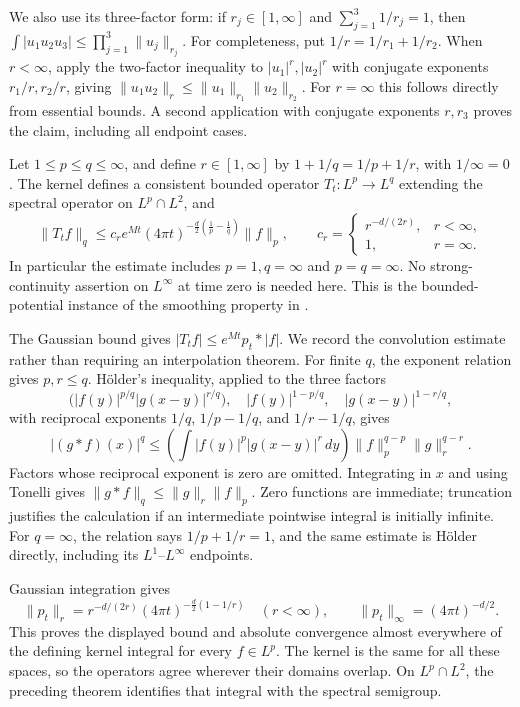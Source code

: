 We also use its three-factor form: if $r_j\in[1,\infty]$ and
$\sum_{j=1}^3 1/r_j=1$, then
$\int|u_1u_2u_3|\leq\prod_{j=1}^3\|u_j\|_{r_j}$.
For completeness, put $1/r=1/r_1+1/r_2$. When $r<\infty$,
apply the two-factor inequality to $|u_1|^r,|u_2|^r$ with conjugate
exponents $r_1/r,r_2/r$, giving
$\|u_1u_2\|_r\leq\|u_1\|_{r_1}\|u_2\|_{r_2}$.
For $r=\infty$ this follows directly from essential bounds.
A second application with conjugate exponents $r,r_3$ proves the
claim, including all endpoint cases.

\begin{corollary}
\label{cor:schrodinger_Lp_Lq}
Let $1\leq p\leq q\leq\infty$, and define $r\in[1,\infty]$ by
$1+1/q=1/p+1/r$, with $1/\infty=0$. The kernel defines a consistent
bounded operator $T_t:L^p\to L^q$ extending the spectral operator on
$L^p\cap L^2$, and
\[
\|T_tf\|_q\leq
c_r e^{Mt}(4\pi t)^{-\frac d2(\frac1p-\frac1q)}\|f\|_p,
\qquad
c_r=\begin{cases}r^{-d/(2r)},&r<\infty,\\1,&r=\infty.\end{cases}
\]
In particular the estimate includes $p=1,q=\infty$ and
$p=q=\infty$. No strong-continuity assertion on $L^\infty$ at time
zero is needed here. This is the bounded-potential instance of the
smoothing property in \parencite[Theorem~2.1]{CyconFroeseKirschSimon1987}.
\end{corollary}
\Proof
The Gaussian bound gives $|T_tf|\leq e^{Mt}p_t*|f|$. We record the
convolution estimate rather than requiring an interpolation theorem.
For finite $q$, the exponent relation gives $p,r\leq q$. H\"older's
inequality, applied to the three factors
\[
\bigl(|f(y)|^{p/q}|g(x-y)|^{r/q}\bigr),\quad
|f(y)|^{1-p/q},\quad |g(x-y)|^{1-r/q},
\]
with reciprocal exponents $1/q$, $1/p-1/q$, and $1/r-1/q$, gives
\[
|(g*f)(x)|^q
\leq\left(\int |f(y)|^p|g(x-y)|^r\,dy\right)
       \|f\|_p^{q-p}\|g\|_r^{q-r}.
\]
Factors whose reciprocal exponent is zero are omitted. Integrating in
$x$ and using Tonelli gives $\|g*f\|_q\leq\|g\|_r\|f\|_p$.
Zero functions are immediate; truncation justifies the calculation if
an intermediate pointwise integral is initially infinite. For
$q=\infty$, the relation says $1/p+1/r=1$, and the same estimate
is H\"older directly, including its $L^1$--$L^\infty$ endpoints.

Gaussian integration gives
\[
\|p_t\|_r=r^{-d/(2r)}(4\pi t)^{-\frac d2(1-1/r)}
\quad(r<\infty),\qquad
\|p_t\|_\infty=(4\pi t)^{-d/2}.
\]
This proves the displayed bound and absolute convergence almost
everywhere of the defining kernel integral for every $f\in L^p$.
The kernel is the same for all these spaces, so the operators agree
wherever their domains overlap. On $L^p\cap L^2$, the preceding
theorem identifies that integral with the spectral semigroup.
\Done

